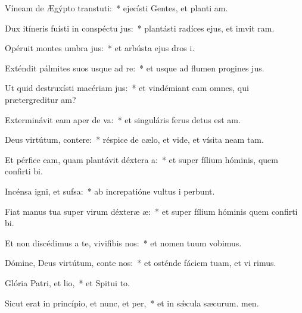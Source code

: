 \item Víneam de Ægýpto transtuti:~* ejecísti Gentes, et planti am.
\item Dux itíneris fuísti in conspéctu jus:~* plantásti radíces ejus, et imvit ram.
\item Opéruit montes umbra jus:~* et arbústa ejus dros i.
\item Exténdit pálmites suos usque ad re:~* et usque ad flumen progines jus.
\item Ut quid destruxísti macériam jus:~* et vindémiant eam omnes, qui prætergreditur am?
\item Exterminávit eam aper de va:~* et singuláris ferus detus est am.
\item Deus virtútum, contere:~* réspice de cælo, et vide, et vísita neam tam.
\item Et pérfice eam, quam plantávit déxtera a:~* et super fílium hóminis, quem confirti bi.
\item Incénsa igni, et sufsa:~* ab increpatióne vultus i perbunt.
\item Fiat manus tua super virum déxteræ æ:~* et super fílium hóminis quem confirti bi.
\item Et non discédimus a te, vivifibis nos:~* et nomen tuum vobimus.
\item Dómine, Deus virtútum, conte nos:~* et osténde fáciem tuam, et vi rimus.
\item Glória Patri, et lio,~* et Spitui to.
\item Sicut erat in princípio, et nunc, et per,~* et in sǽcula sæcurum. men.
